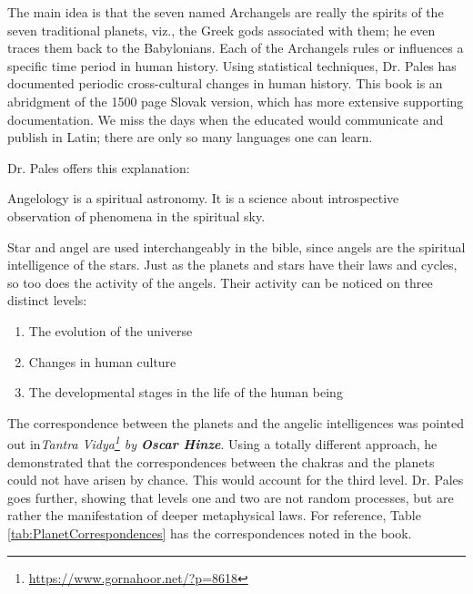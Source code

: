 The main idea is that the seven named Archangels are really the spirits of the seven traditional planets, viz., the Greek gods associated with them; he even traces them back to the Babylonians. Each of the Archangels rules or influences a specific time period in human history. Using statistical techniques, Dr. Pales has documented periodic cross-cultural changes in human history. This book is an abridgment of the 1500 page Slovak version, which has more extensive supporting documentation. We miss the days when the educated would communicate and publish in Latin; there are only so many languages one can learn.

Dr. Pales offers this explanation:

\begin{quotex}
Angelology is a spiritual astronomy. It is a science about introspective observation of phenomena in the spiritual sky.
\end{quotex}


Star and angel are used interchangeably in the bible, since angels are the spiritual intelligence of the stars. Just as the planets and stars have their laws and cycles, so too does the activity of the angels. Their activity can be noticed on three distinct levels:

\begin{enumerate}


\item The evolution of the universe

\item Changes in human culture

\item The developmental stages in the life of the human being
\end{enumerate}


The correspondence between the planets and the angelic intelligences was pointed out in\emph{Tantra Vidya\footnote{\url{https://www.gornahoor.net/?p=8618}} by \textbf{Oscar Hinze}}. Using a totally different approach, he demonstrated that the correspondences between the chakras and the planets could not have arisen by chance. This would account for the third level. Dr. Pales goes further, showing that levels one and two are not random processes, but are rather the manifestation of deeper metaphysical laws. For reference, Table \ref{tab:PlanetCorrespondences} has the correspondences noted in the book.

